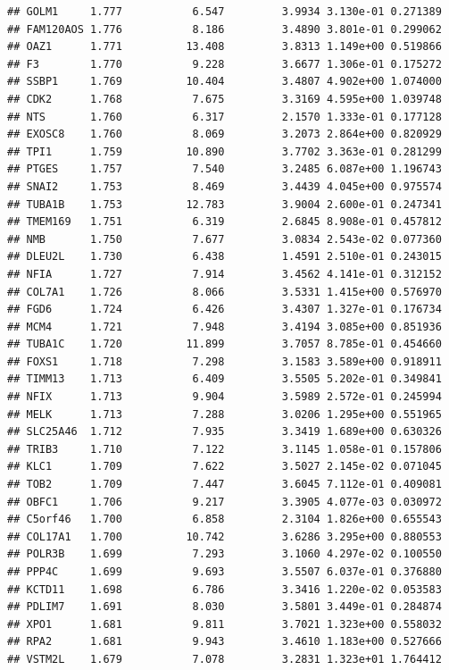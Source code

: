 \documentclass{article}\usepackage[]{graphicx}\usepackage[]{color}
\makeatletter
\newenvironment{kframe}{%
 \def\at@end@of@kframe{}%
 \ifinner\ifhmode%
  \def\at@end@of@kframe{\end{minipage}}%
  \begin{minipage}{\columnwidth}%
 \fi\fi%
 \def\FrameCommand##1{\hskip\@totalleftmargin \hskip-\fboxsep
 \colorbox{shadecolor}{##1}\hskip-\fboxsep
     \hskip-\linewidth \hskip-\@totalleftmargin \hskip\columnwidth}%
 \MakeFramed {\advance\hsize-\width
   \@totalleftmargin\z@ \linewidth\hsize
   \@setminipage}}%
 {\par\unskip\endMakeFramed%
 \at@end@of@kframe}
\newenvironment{knitrout}{}{} %
\makeatother
\begin{document}
\begin{knitrout}
\begin{kframe}
\begin{verbatim}
## GOLM1     1.777           6.547         3.9934 3.130e-01 0.271389
## FAM120AOS 1.776           8.186         3.4890 3.801e-01 0.299062
## OAZ1      1.771          13.408         3.8313 1.149e+00 0.519866
## F3        1.770           9.228         3.6677 1.306e-01 0.175272
## SSBP1     1.769          10.404         3.4807 4.902e+00 1.074000
## CDK2      1.768           7.675         3.3169 4.595e+00 1.039748
## NTS       1.760           6.317         2.1570 1.333e-01 0.177128
## EXOSC8    1.760           8.069         3.2073 2.864e+00 0.820929
## TPI1      1.759          10.890         3.7702 3.363e-01 0.281299
## PTGES     1.757           7.540         3.2485 6.087e+00 1.196743
## SNAI2     1.753           8.469         3.4439 4.045e+00 0.975574
## TUBA1B    1.753          12.783         3.9004 2.600e-01 0.247341
## TMEM169   1.751           6.319         2.6845 8.908e-01 0.457812
## NMB       1.750           7.677         3.0834 2.543e-02 0.077360
## DLEU2L    1.730           6.438         1.4591 2.510e-01 0.243015
## NFIA      1.727           7.914         3.4562 4.141e-01 0.312152
## COL7A1    1.726           8.066         3.5331 1.415e+00 0.576970
## FGD6      1.724           6.426         3.4307 1.327e-01 0.176734
## MCM4      1.721           7.948         3.4194 3.085e+00 0.851936
## TUBA1C    1.720          11.899         3.7057 8.785e-01 0.454660
## FOXS1     1.718           7.298         3.1583 3.589e+00 0.918911
## TIMM13    1.713           6.409         3.5505 5.202e-01 0.349841
## NFIX      1.713           9.904         3.5989 2.572e-01 0.245994
## MELK      1.713           7.288         3.0206 1.295e+00 0.551965
## SLC25A46  1.712           7.935         3.3419 1.689e+00 0.630326
## TRIB3     1.710           7.122         3.1145 1.058e-01 0.157806
## KLC1      1.709           7.622         3.5027 2.145e-02 0.071045
## TOB2      1.709           7.447         3.6045 7.112e-01 0.409081
## OBFC1     1.706           9.217         3.3905 4.077e-03 0.030972
## C5orf46   1.700           6.858         2.3104 1.826e+00 0.655543
## COL17A1   1.700          10.742         3.6286 3.295e+00 0.880553
## POLR3B    1.699           7.293         3.1060 4.297e-02 0.100550
## PPP4C     1.699           9.693         3.5507 6.037e-01 0.376880
## KCTD11    1.698           6.786         3.3416 1.220e-02 0.053583
## PDLIM7    1.691           8.030         3.5801 3.449e-01 0.284874
## XPO1      1.681           9.811         3.7021 1.323e+00 0.558032
## RPA2      1.681           9.943         3.4610 1.183e+00 0.527666
## VSTM2L    1.679           7.078         3.2831 1.323e+01 1.764412

\end{verbatim}
\end{kframe}
\end{knitrout}
\end{document}
